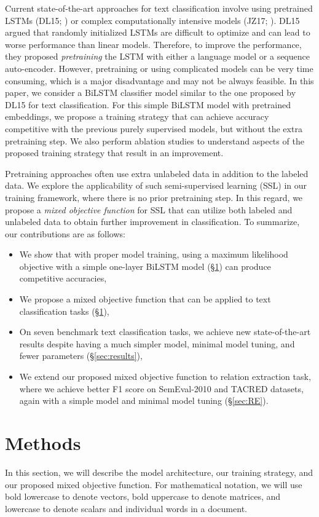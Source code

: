 \documentclass[letterpaper]{article}
\newcommand{\citealp}[1]{\citeauthor{#1} \citeyear{#1}}
\begin{document}
Current state-of-the-art approaches for text classification involve using pretrained LSTMs (DL15; \citealp{dai2015semi}) or complex computationally intensive models (JZ17; \citealp{johnson2017deep}). DL15 argued that randomly initialized LSTMs are difficult to optimize and can lead to worse performance than linear models. Therefore, to improve the performance, they proposed \emph{pretraining} the LSTM with either a language model or a sequence auto-encoder. However, pretraining or using complicated models can be very time consuming, which is a major disadvantage and may not be always feasible. In this paper, we consider a BiLSTM classifier model similar to the one proposed by DL15 for text classification. For this simple BiLSTM model with pretrained embeddings, we propose a training strategy that can achieve accuracy competitive with the previous purely supervised models, but without the extra pretraining step. We also perform ablation studies to understand aspects of the proposed training strategy that result in an improvement.

Pretraining approaches often use extra unlabeled data in addition to the labeled data.
We explore the applicability of such semi-supervised learning (SSL) in our training framework, where there is no prior pretraining step.
In this regard, we propose a \emph{mixed objective function} for SSL that can utilize both labeled and unlabeled data to obtain further improvement in classification. To summarize, our contributions are as follows:
\begin{itemize}
\itemsep0em
\item We show that with proper model training, using a maximum likelihood objective with a simple one-layer BiLSTM model (\S\ref{sec:methods}) can produce competitive accuracies,
\item We propose a mixed objective function that can be applied to text classification tasks (\S\ref{sec:methods}),
\item On seven benchmark text classification tasks, we achieve new state-of-the-art results despite having a much simpler model, minimal model tuning, and fewer parameters (\S\ref{sec:results}),
\item We extend our proposed mixed objective function to relation extraction task, where we achieve better F1 score on SemEval-2010 and TACRED datasets, again with a simple model and minimal model tuning (\S\ref{sec:RE}).
\end{itemize}

\section{Methods} \label{sec:methods}
In this section, we will describe the model architecture, our training strategy, and our proposed mixed objective function.
For mathematical notation, we will use bold lowercase to denote vectors, bold uppercase to denote matrices, and lowercase to denote scalars and individual words in a document.
\end{document}
